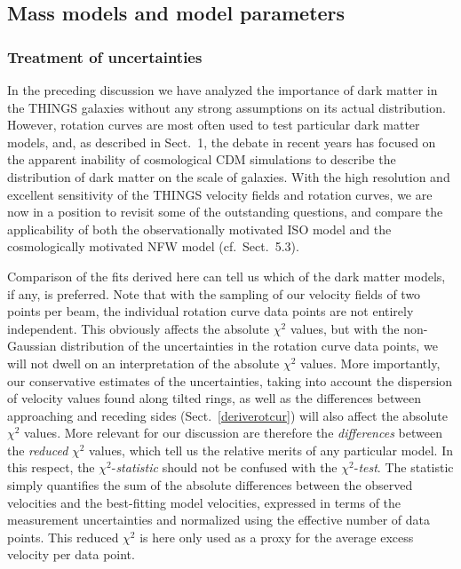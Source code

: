 \documentclass[usenatbib,usegraphicx,apjfonts,floatfix]{emulateapj}
\begin{document}
\subsection{Mass models and model parameters}

\subsubsection{Treatment of uncertainties}

In the preceding discussion we have analyzed the importance of dark
matter in the THINGS galaxies without any strong assumptions on its
actual distribution. However, rotation curves are most often used to
test particular dark matter models, and, as described in Sect.~1, the
debate in recent years has focused on the apparent inability of
cosmological CDM simulations to describe the distribution of dark
matter on the scale of galaxies.  With the high resolution and
excellent sensitivity of the THINGS velocity fields and rotation
curves, we are now in a position to revisit some of the
outstanding questions, and compare the applicability of both the
observationally motivated ISO model and the cosmologically motivated
NFW model (cf.\ Sect.~5.3).

Comparison of the fits derived here can tell us which of the dark
matter models, if any, is preferred. Note that with the sampling of
our velocity fields of two points per beam, the individual rotation
curve data points are not entirely independent. This obviously affects
the absolute $\chi^2$ values, but with the non-Gaussian distribution
of the uncertainties in the rotation curve data points, we will not
dwell on an interpretation of the absolute $\chi^2$ values.  More
importantly, our conservative estimates of the uncertainties, taking
into account the dispersion of velocity values found along tilted
rings, as well as the differences between approaching and receding
sides (Sect.~\ref{deriverotcur}) will also affect the absolute
$\chi^2$ values.  More relevant for our discussion are therefore the
\emph{differences} between the \emph{reduced} $\chi^2$ values, which
tell us the relative merits of any particular model.  In this respect,
the $\chi^2$-\emph{statistic} should  not be confused with the
$\chi^2$-\emph{test}.  The statistic simply quantifies the sum of the
absolute differences between the observed velocities and the
best-fitting model velocities, expressed in terms of the measurement
uncertainties and normalized using the effective number of data
points.  This reduced $\chi^2$ is here only used as a proxy for the
average excess velocity per data point.
\end{document}
